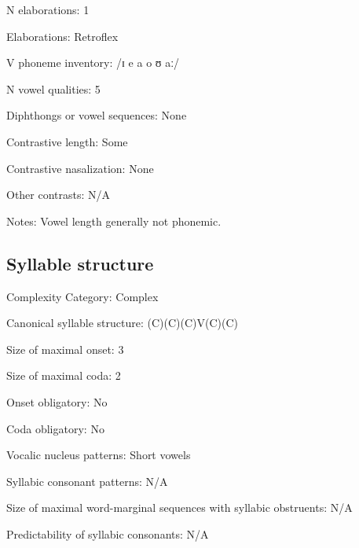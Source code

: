 {\begin{appendixdesc}
\item[N elaborations:] 1

\item[Elaborations:] Retroflex

\item[V phoneme inventory:] /ɪ e a o ʊ aː/

\item[N vowel qualities:] 5

\item[Diphthongs or vowel sequences:] None

\item[Contrastive length:] Some

\item[Contrastive nasalization:] None

\item[Other contrasts:] N/A

\item[Notes:] Vowel length generally not phonemic.
\end{appendixdesc}
\subsection*{Syllable structure}
\begin{appendixdesc}

\item[Complexity Category:] Complex

\item[Canonical syllable structure:] (C)(C)(C)V(C)(C) \citep[23--26]{Rumsey1978}

\item[Size of maximal onset:] 3

\item[Size of maximal coda:] 2

\item[Onset obligatory:] No

\item[Coda obligatory:] No

\item[Vocalic nucleus patterns:] Short vowels

\item[Syllabic consonant patterns:] N/A

\item[Size of maximal word-marginal sequences with syllabic obstruents:] N/A

\item[Predictability of syllabic consonants:] N/A


\end{appendixdesc}}
